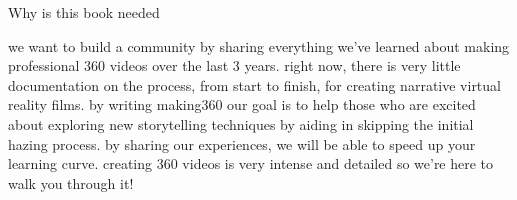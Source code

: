 {\large Why is this book needed \par}
\begin{fullwidth}

we want to build a community by sharing everything we've learned about making professional 360 videos over the last 3 years. right now, there is very little documentation on the process, from start to finish, for creating narrative virtual reality films. by writing making360 our goal is to help those who are excited about exploring new storytelling techniques by aiding in skipping the initial hazing process. by sharing our experiences, we will be able to speed up your learning curve. creating 360 videos is very intense and detailed so we're here to walk you through it!


\clearpage
\end{fullwidth}
